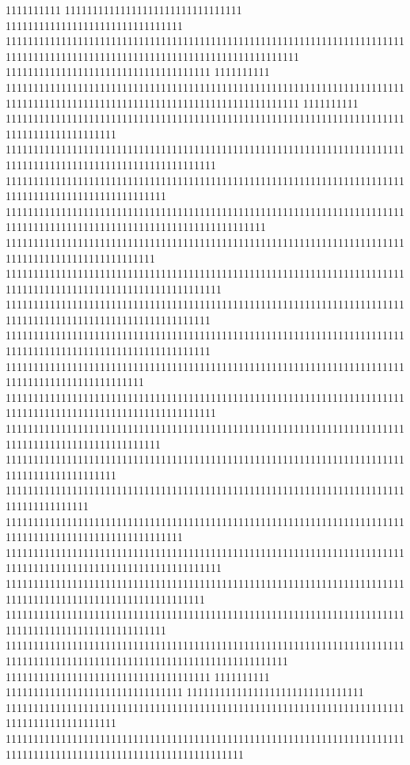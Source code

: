 1111111111
11111111111111111111111111111111
11111111111111111111111111111111
11111111111111111111111111111111111111111111111111111111111111111111111111111111111111111111111111111111111111111111111111111
1111111111111111111111111111111111111
1111111111
11111111111111111111111111111111111111111111111111111111111111111111111111111111111111111111111111111111111111111111111111111
1111111111
11111111111111111111111111111111111111111111111111111111111111111111111111111111111111111111
11111111111111111111111111111111111111111111111111111111111111111111111111111111111111111111111111111111111111
11111111111111111111111111111111111111111111111111111111111111111111111111111111111111111111111111111
11111111111111111111111111111111111111111111111111111111111111111111111111111111111111111111111111111111111111111111111
111111111111111111111111111111111111111111111111111111111111111111111111111111111111111111111111111
111111111111111111111111111111111111111111111111111111111111111111111111111111111111111111111111111111111111111
1111111111111111111111111111111111111111111111111111111111111111111111111111111111111111111111111111111111111
1111111111111111111111111111111111111111111111111111111111111111111111111111111111111111111111111111111111111
1111111111111111111111111111111111111111111111111111111111111111111111111111111111111111111111111
11111111111111111111111111111111111111111111111111111111111111111111111111111111111111111111111111111111111111
1111111111111111111111111111111111111111111111111111111111111111111111111111111111111111111111111111
11111111111111111111111111111111111111111111111111111111111111111111111111111111111111111111
111111111111111111111111111111111111111111111111111111111111111111111111111111111111111
11111111111111111111111111111111111111111111111111111111111111111111111111111111111111111111111111111111
111111111111111111111111111111111111111111111111111111111111111111111111111111111111111111111111111111111111111
111111111111111111111111111111111111111111111111111111111111111111111111111111111111111111111111111111111111
11111111111111111111111111111111111111111111111111111111111111111111111111111111111111111111111111111
111111111111111111111111111111111111111111111111111111111111111111111111111111111111111111111111111111111111111111111111111
1111111111111111111111111111111111111
1111111111
11111111111111111111111111111111
11111111111111111111111111111111
11111111111111111111111111111111111111111111111111111111111111111111111111111111111111111111
1111111111111111111111111111111111111111111111111111111111111111111111111111111111111111111111111111111111111111111
